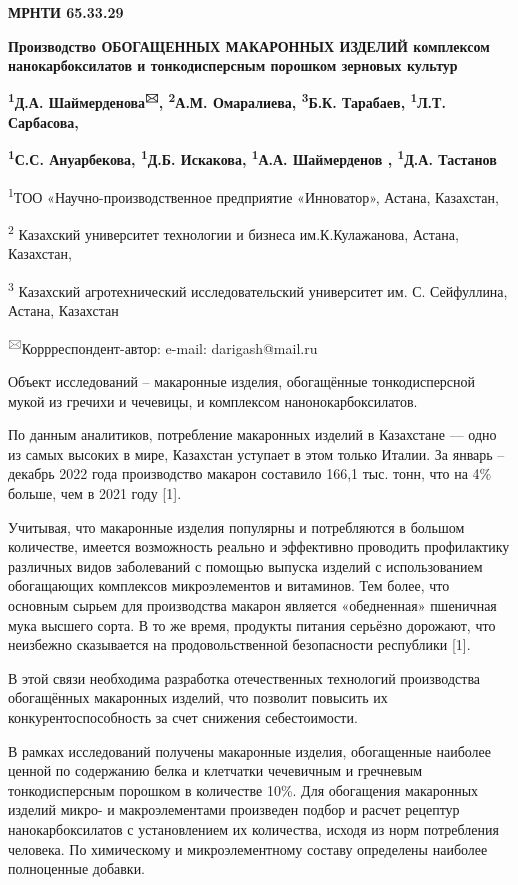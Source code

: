 
\newpage
{\bfseries МРНТИ 65.33.29}

{\bfseries Производство ОБОГАЩЕННЫХ МАКАРОННЫХ ИЗДЕЛИЙ комплексом
нанокарбоксилатов и тонкодисперсным порошком зерновых культур}

{\bfseries \textsuperscript{1}Д.А. Шаймерденова\textsuperscript{🖂},
\textsuperscript{2}А.М. Омаралиева, \textsuperscript{3}Б.К. Тарабаев,
\textsuperscript{1}Л.Т. Сарбасова,}

{\bfseries \textsuperscript{1}С.С. Ануарбекова, \textsuperscript{1}Д.Б.
Искакова, \textsuperscript{1}А.А. Шаймерденов , \textsuperscript{1}Д.А.
Тастанов}

\textsuperscript{1}ТОО «Научно-производственное предприятие «Инноватор»,
Астана, Казахстан,

\textsuperscript{2} Казахский университет технологии и бизнеса
им.К.Кулажанова, Астана, Казахстан,

\textsuperscript{3} Казахский агротехнический исследовательский
университет им. С. Сейфуллина, Астана, Казахстан

\textsuperscript{🖂}Коррреспондент-автор: e-mail: darigash@mail.ru

Объект исследований -- макаронные изделия, обогащённые тонкодисперсной
мукой из гречихи и чечевицы, и комплексом нанонокарбоксилатов.

По данным аналитиков, потребление макаронных изделий в Казахстане ---
одно из самых высоких в мире, Казахстан уступает в этом только Италии.
За январь -- декабрь 2022 года производство макарон составило 166,1 тыс.
тонн, что на 4\% больше, чем в 2021 году {[}1{]}.

Учитывая, что макаронные изделия популярны и потребляются в большом
количестве, имеется возможность реально и эффективно проводить
профилактику различных видов заболеваний с помощью выпуска изделий с
использованием обогащающих комплексов микроэлементов и витаминов. Тем
более, что основным сырьем для производства макарон является
«обедненная» пшеничная мука высшего сорта. В то же время, продукты
питания серьёзно дорожают, что неизбежно сказывается на
продовольственной безопасности республики {[}1{]}.

В этой связи необходима разработка отечественных технологий производства
обогащённых макаронных изделий, что позволит повысить их
конкурентоспособность за счет снижения себестоимости.

В рамках исследований получены макаронные изделия, обогащенные наиболее
ценной по содержанию белка и клетчатки чечевичным и гречневым
тонкодисперсным порошком в количестве 10\%. Для обогащения макаронных
изделий микро- и макроэлементами произведен подбор и расчет рецептур
нанокарбоксилатов с установлением их количества, исходя из норм
потребления человека. По химическому и микроэлементному составу
определены наиболее полноценные добавки.


